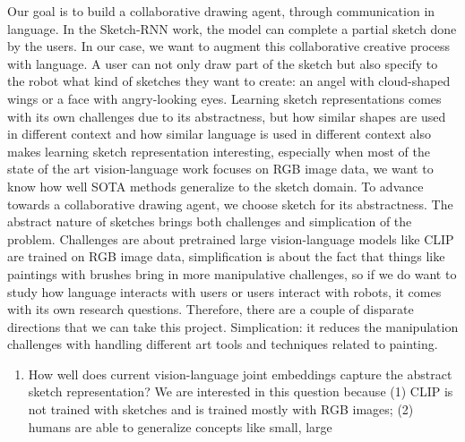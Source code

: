 
Our goal is to build a collaborative drawing agent, through communication in language. In the Sketch-RNN work, the model can complete a partial sketch done by the users. In our case, we want to augment this collaborative creative process with language. A user can not only draw part of the sketch but also specify to the robot what kind of sketches they want to create: an angel with cloud-shaped wings or a face with angry-looking eyes. 
Learning sketch representations comes with its own challenges due to its abstractness, but how similar shapes are used in different context and how similar language is used in different context also makes learning sketch representation interesting, especially when most of the state of the art vision-language work focuses on RGB image data, we want to know how well SOTA methods generalize to the sketch domain. To advance towards a collaborative drawing agent, we choose sketch for its abstractness. 
The abstract nature of sketches brings both challenges and simplication of the problem. Challenges are about pretrained large vision-language models like CLIP are trained on RGB image data, simplification is about the fact that things like paintings with brushes bring in more manipulative challenges, so if we do want to study how language interacts with users or users interact with robots, it comes with its own research questions. Therefore, there are a couple of disparate directions that we can take this project. Simplication: it reduces the manipulation challenges with handling different art tools and techniques related to painting.   
\begin{enumerate}
    \item How well does current vision-language joint embeddings capture the abstract sketch representation? We are interested in this question because (1) CLIP is not trained with sketches and is trained mostly with RGB images; (2) humans are able to generalize concepts like small, large  
\end{enumerate}

